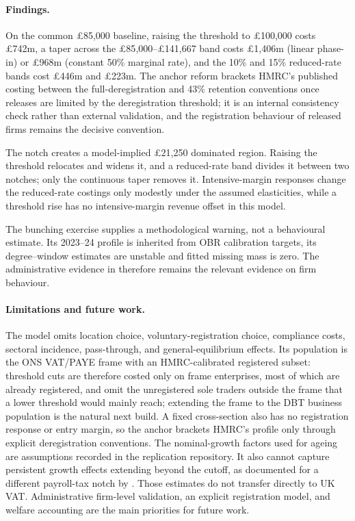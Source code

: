 \paragraph{Findings.} On the common \pounds85{,}000 baseline, raising the
threshold to \pounds100{,}000 costs \pounds742m, a taper across the
\pounds85{,}000--\pounds141{,}667 band costs \pounds1{,}406m (linear phase-in) or
\pounds968m (constant 50\% marginal rate), and the 10\% and 15\%
reduced-rate bands cost \pounds446m and \pounds223m. The anchor reform
brackets HMRC's published costing between the full-deregistration and 43\%
retention conventions once releases are limited by the deregistration
threshold; it is an internal consistency check rather than external
validation, and the registration behaviour of released firms remains the
decisive convention.

The notch creates a model-implied \pounds21{,}250 dominated region. Raising the
threshold relocates and widens it, and a reduced-rate band divides it between two notches;
only the continuous taper removes it. Intensive-margin responses change the
reduced-rate costings only modestly under the assumed elasticities, while a
threshold rise has no intensive-margin revenue offset in this model.

The bunching exercise supplies a methodological warning, not a behavioural
estimate. Its 2023--24 profile is inherited from OBR calibration targets, its
degree--window estimates are unstable and fitted missing mass is zero. The
administrative evidence in \citet{liuetal2021} therefore remains the relevant
evidence on firm behaviour.

\paragraph{Limitations and future work.} The model omits location choice,
voluntary-registration choice, compliance costs, sectoral incidence,
pass-through, and general-equilibrium effects. Its population is the ONS
VAT/PAYE frame with an HMRC-calibrated registered subset: threshold cuts are
therefore costed only on frame enterprises, most of which are already
registered, and omit the unregistered sole traders outside the frame that a
lower threshold would mainly reach; extending the frame to the DBT business
population is the natural next build. A fixed cross-section also has no
registration response or entry margin, so the anchor brackets HMRC's profile
only through explicit deregistration conventions. The nominal-growth factors
used for ageing are assumptions recorded in the replication repository. It also cannot capture persistent
growth effects extending beyond the cutoff, as documented for a different
payroll-tax notch by \citet{jysmabenzartiharju2026}. Those estimates do not
transfer directly to UK VAT. Administrative firm-level validation, an explicit
registration model, and welfare accounting are the main priorities for future
work.
